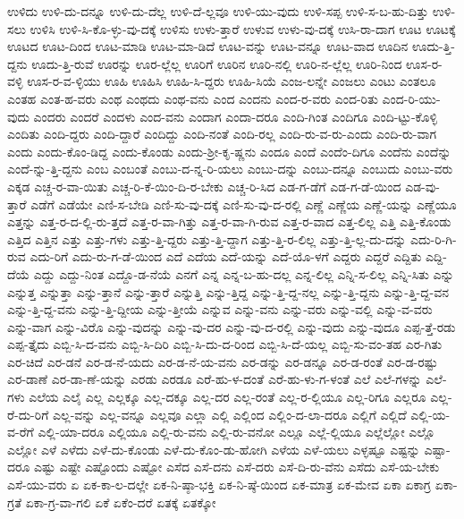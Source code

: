 {ಉಳಿದು
ಉಳಿ-ದು-ದನ್ನೂ
ಉಳಿ-ದು-ದೆಲ್ಲ
ಉಳಿ-ದೆ-ಲ್ಲವೂ
ಉಳಿ-ಯು-ವುದು
ಉಳಿ-ಸಪ್ಪ
ಉಳಿ-ಸ-ಬ-ಹು-ದಿತ್ತು
ಉಳಿ-ಸಲು
ಉಳಿಸಿ
ಉಳಿ-ಸಿ-ಕೊ-ಳ್ಳು-ವು-ದಕ್ಕೆ
ಉಳಿಸು
ಉಳು-ತ್ತಾರೆ
ಉಳುವ
ಉಳು-ವು-ದಕ್ಕೆ
ಉಸಿ-ರಾ-ದಾಗ
ಊಟ
ಊಟಕ್ಕೆ
ಊಟದ
ಊಟ-ದಿಂದ
ಊಟ-ಮಾಡಿ
ಊಟ-ಮಾ-ಡಿದೆ
ಊಟ-ವನ್ನು
ಊಟ-ವನ್ನೂ
ಊಟ-ವಾದ
ಊದಿನ
ಊದು-ತ್ತಿ-ದ್ದನು
ಊದು-ತ್ತಿ-ರುವೆ
ಊರನ್ನು
ಊರ-ಲ್ಲೆಲ್ಲ
ಊರಿಗೆ
ಊರಿನ
ಊರಿ-ನಲ್ಲಿ
ಊರಿ-ನ-ಲ್ಲೆಲ್ಲ
ಊರಿ-ನಿಂದ
ಊಸ-ರ-ವಳ್ಳಿ
ಊಸ-ರ-ವ-ಳ್ಳಿಯು
ಊಹಿ
ಊಹಿಸಿ
ಊಹಿ-ಸಿ-ದ್ದರು
ಊಹಿ-ಸಿಯೆ
ಎಂಜ-ಲನ್ನೇ
ಎಂಜಲು
ಎಂಟು
ಎಂತಲೂ
ಎಂತಹ
ಎಂತ-ಹ-ವರು
ಎಂಥ
ಎಂಥದು
ಎಂಥ-ವನು
ಎಂದ
ಎಂದನು
ಎಂದ-ರ-ವರು
ಎಂದ-ರಿತು
ಎಂದ-ರಿ-ಯು-ವುದು
ಎಂದರು
ಎಂದರೆ
ಎಂದಳು
ಎಂದ-ವನು
ಎಂದಾಗ
ಎಂದಾ-ದರೂ
ಎಂದಿ-ಗಿಂತ
ಎಂದಿಗೂ
ಎಂದಿ-ಟ್ಟು-ಕೊಳ್ಳಿ
ಎಂದಿತು
ಎಂದಿ-ದ್ದರು
ಎಂದಿ-ದ್ದಾರೆ
ಎಂದಿದ್ದು
ಎಂದಿ-ನಂತೆ
ಎಂದಿ-ರಲ್ಲ
ಎಂದಿ-ರು-ವ-ರು-ಎಂದು
ಎಂದಿ-ರು-ವಾಗ
ಎಂದು
ಎಂದು-ಕೊಂ-ಡಿದ್ದ
ಎಂದು-ಕೊಂಡು
ಎಂದು-ಶ್ರೀ-ಕೃ-ಷ್ಣನು
ಎಂದೂ
ಎಂದೆ
ಎಂದೆಂ-ದಿಗೂ
ಎಂದೆನು
ಎಂದೆನ್ನು
ಎಂದೆ-ನ್ನು-ತ್ತಿ-ದ್ದನು
ಎಂಬ
ಎಂಬಂತೆ
ಎಂಬು-ದ-ನ್ನ-ರಿ-ಯಲು
ಎಂಬು-ದನ್ನು
ಎಂಬು-ದನ್ನೂ
ಎಂಬುದು
ಎಂಬು-ವರು
ಎಕ್ಕಡ
ಎಚ್ಚ-ರ-ವಾ-ಯಿತು
ಎಚ್ಚ-ರಿ-ಕೆ-ಯಿಂ-ದಿ-ರ-ಬೇಕು
ಎಚ್ಚ-ರಿ-ಸಿದ
ಎಡ-ಗ-ಡೆಗೆ
ಎಡ-ಗ-ಡೆ-ಯಿಂದ
ಎಡ-ವು-ತ್ತಾರೆ
ಎಡೆಗೆ
ಎಡೆಯೇ
ಎಣಿ-ಸ-ಬೇಡಿ
ಎಣಿ-ಸು-ವು-ದಕ್ಕೆ
ಎಣಿ-ಸು-ವು-ದ-ರಲ್ಲಿ
ಎಣ್ಣೆ
ಎಣ್ಣೆಯ
ಎಣ್ಣೆ-ಯನ್ನು
ಎಣ್ಣೆಯೂ
ಎತ್ತನ್ನು
ಎತ್ತ-ರ-ದ-ಲ್ಲಿ-ರು-ತ್ತದೆ
ಎತ್ತ-ರ-ವಾ-ಗಿತ್ತು
ಎತ್ತ-ರ-ವಾ-ಗಿ-ರುವ
ಎತ್ತ-ರ-ವಾದ
ಎತ್ತ-ಲಿಲ್ಲ
ಎತ್ತಿ
ಎತ್ತಿ-ಕೊಂಡು
ಎತ್ತಿದ
ಎತ್ತಿನ
ಎತ್ತು
ಎತ್ತು-ಗಳು
ಎತ್ತು-ತ್ತಿ-ದ್ದರು
ಎತ್ತು-ತ್ತಿ-ದ್ದಾಗ
ಎತ್ತು-ತ್ತಿ-ರ-ಲಿಲ್ಲ
ಎತ್ತು-ತ್ತಿ-ಲ್ಲ-ದು-ದನ್ನು
ಎದು-ರಿ-ಗಿ-ರುವ
ಎದು-ರಿಗೆ
ಎದು-ರು-ಗ-ಡೆ-ಯಿಂದ
ಎದೆ
ಎದೆಯ
ಎದೆ-ಯನ್ನು
ಎದೆ-ಯೊ-ಳಗೆ
ಎದ್ದರು
ಎದ್ದರೆ
ಎದ್ದಿತು
ಎದ್ದಿ-ದೆಯೆ
ಎದ್ದು
ಎದ್ದು-ನಿಂತ
ಎದ್ದೊ-ಡ-ನೆಯೆ
ಎನಗೆ
ಎನ್ನ
ಎನ್ನ-ಬ-ಹು-ದಲ್ಲ
ಎನ್ನ-ಲಿಲ್ಲ
ಎನ್ನಿ-ಸ-ಲಿಲ್ಲ
ಎನ್ನಿ-ಸಿತು
ಎನ್ನು
ಎನ್ನುತ್ತ
ಎನ್ನುತ್ತಾ
ಎನ್ನು-ತ್ತಾನೆ
ಎನ್ನು-ತ್ತಾರೆ
ಎನ್ನುತ್ತಿ
ಎನ್ನು-ತ್ತಿದ್ದ
ಎನ್ನು-ತ್ತಿ-ದ್ದ-ನಲ್ಲ
ಎನ್ನು-ತ್ತಿ-ದ್ದನು
ಎನ್ನು-ತ್ತಿ-ದ್ದ-ವನ
ಎನ್ನು-ತ್ತಿ-ದ್ದ-ವನು
ಎನ್ನು-ತ್ತಿ-ದ್ದೀಯ
ಎನ್ನು-ತ್ತೀಯೆ
ಎನ್ನುವ
ಎನ್ನು-ವನು
ಎನ್ನು-ವರು
ಎನ್ನು-ವಲ್ಲಿ
ಎನ್ನು-ವ-ವರು
ಎನ್ನು-ವಾಗ
ಎನ್ನು-ವಿರೊ
ಎನ್ನು-ವುದನ್ನು
ಎನ್ನು-ವು-ದರ
ಎನ್ನು-ವು-ದ-ರಲ್ಲಿ
ಎನ್ನು-ವುದು
ಎನ್ನು-ವುದೂ
ಎಪ್ಪ-ತ್ತೆ-ರಡು
ಎಪ್ಪ-ತ್ತೈದು
ಎಬ್ಬಿ-ಸಿ-ದ-ವನು
ಎಬ್ಬಿ-ಸಿ-ದಿರಿ
ಎಬ್ಬಿ-ಸಿ-ದು-ದ-ರಿಂದ
ಎಬ್ಬಿ-ಸಿ-ದೆ-ಯಲ್ಲ
ಎಬ್ಬಿ-ಸು-ವಂ-ತಹ
ಎರ-ಗಿತು
ಎರ-ಚಿದೆ
ಎರ-ಡನೆ
ಎರ-ಡ-ನೆ-ಯದು
ಎರ-ಡ-ನೆ-ಯ-ವನು
ಎರ-ಡನ್ನು
ಎರ-ಡನ್ನೂ
ಎರ-ಡ-ರಂತೆ
ಎರ-ಡ-ರಷ್ಟು
ಎರ-ಡಾಣೆ
ಎರ-ಡಾ-ಣೆ-ಯನ್ನು
ಎರಡು
ಎರಡೂ
ಎರೆ-ಹು-ಳ-ದಂತೆ
ಎರೆ-ಹು-ಳು-ಗ-ಳಂತೆ
ಎಲೆ
ಎಲೆ-ಗಳನ್ನು
ಎಲೆ-ಗಳು
ಎಲೆಯ
ಎಲೈ
ಎಲ್ಲ
ಎಲ್ಲಕ್ಕೂ
ಎಲ್ಲ-ದಕ್ಕೂ
ಎಲ್ಲ-ದರ
ಎಲ್ಲ-ರಂತೆ
ಎಲ್ಲ-ರ-ಲ್ಲಿಯೂ
ಎಲ್ಲ-ರಿಗೂ
ಎಲ್ಲರೂ
ಎಲ್ಲ-ರೆ-ದು-ರಿಗೆ
ಎಲ್ಲ-ವನ್ನು
ಎಲ್ಲ-ವನ್ನೂ
ಎಲ್ಲವೂ
ಎಲ್ಲಾ
ಎಲ್ಲಿ
ಎಲ್ಲಿಂದ
ಎಲ್ಲಿಂ-ದ-ಲಾ-ದರೂ
ಎಲ್ಲಿಗೆ
ಎಲ್ಲಿದೆ
ಎಲ್ಲಿ-ಯ-ವ-ರೆಗೆ
ಎಲ್ಲಿ-ಯಾ-ದರೂ
ಎಲ್ಲಿಯೂ
ಎಲ್ಲಿ-ರು-ವನು
ಎಲ್ಲಿ-ರು-ವನೋ
ಎಲ್ಲೂ
ಎಲ್ಲೆ-ಲ್ಲಿಯೂ
ಎಲ್ಲೆಲ್ಲೋ
ಎಲ್ಲೊ
ಎಲ್ಲೋ
ಎಳೆ
ಎಳೆದು
ಎಳೆ-ದು-ಕೊಂಡು
ಎಳೆ-ದು-ಕೊಂ-ಡು-ಹೋಗಿ
ಎಳೆಯ
ಎಳೆ-ಯಲು
ಎಳ್ಳಷ್ಟೂ
ಎಷ್ಟನ್ನು
ಎಷ್ಟಾ-ದರೂ
ಎಷ್ಟು
ಎಷ್ಟೇ
ಎಷ್ಟೊಂದು
ಎಷ್ಟೋ
ಎಸೆದ
ಎಸೆ-ದನು
ಎಸೆ-ದರು
ಎಸೆ-ದಿ-ರು-ವೆನು
ಎಸೆದು
ಎಸೆ-ಯ-ಬೇಕು
ಎಸೆ-ಯು-ವರು
ಏ
ಏಕ-ಕಾ-ಲ-ದಲ್ಲೇ
ಏಕ-ನಿ-ಷ್ಠಾ-ಭಕ್ತಿ
ಏಕ-ನಿ-ಷ್ಠೆ-ಯಿಂದ
ಏಕ-ಮಾತ್ರ
ಏಕ-ಮೇವ
ಏಕಾ
ಏಕಾಗ್ರ
ಏಕಾ-ಗ್ರತೆ
ಏಕಾ-ಗ್ರ-ವಾ-ಗಲಿ
ಏಕೆ
ಏಕೆಂ-ದರೆ
ಏತಕ್ಕೆ
ಏತಕ್ಕೋ
}
